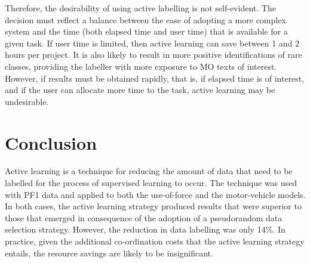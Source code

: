 Therefore, the desirability of using active labelling is not self-evident. The decision must reflect a balance between the ease of adopting a more complex system and the time (both elapsed time and user time) that is available for a given task. If user time is limited, then active learning can save between 1 and 2 hours per project. It is also likely to result in more positive identifications of rare classes, providing the labeller with more exposure to MO texts of interest. However, if results must be obtained rapidly, that is, if elapsed time is of interest, and if the user can allocate more time to the task, active learning may be undesirable. 


\section{Conclusion} Active learning is a technique for reducing the amount of data that need to be labelled for the process of supervised learning to occur. The technique was used with PF1 data and applied to both the use-of-force and the motor-vehicle models. In both cases, the active learning strategy produced results that were superior to those that emerged in consequence of the adoption of a pseudorandom data selection strategy. However, the reduction in data labelling was only 14\%. In practice, given the additional co-ordination costs that the active learning strategy entails, the resource savings are likely to be insignificant. 
 
